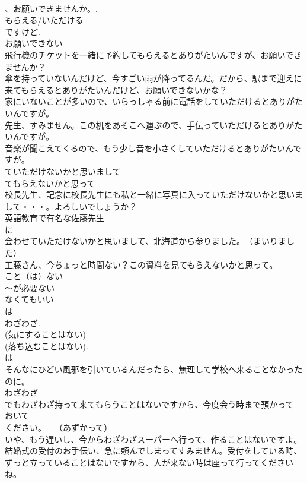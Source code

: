 \documentclass[8pt]{extreport}
\begin{document}
\begin{CJK}{UTF8}{min}
\\	、お願いできませんか。. 
\\	もらえる/いただける 
\\	ですけど. 
\\	お願いできない 
\\	飛行機のチケットを一緒に予約してもらえるとありがたいんですが、お願いできませんか？
\\	傘を持っていないんだけど、今すごい雨が降ってるんだ。だから、駅まで迎えに来てもらえるとありがたいんだけど、お願いできないかな？
\\	家にいないことが多いので、いらっしゃる前に電話をしていただけるとありがたいんですが。
\\	先生、すみません。この机をあそこへ運ぶので、手伝っていただけるとありがたいんですが。
\\	音楽が聞こえてくるので、もう少し音を小さくしていただけるとありがたいんですが。
\\	ていただけないかと思いまして
\\	てもらえないかと思って
\\	校長先生、記念に校長先生にも私と一緒に写真に入っていただけないかと思いまして・・・。よろしいでしょうか？
\\	英語教育で有名な佐藤先生
\\	に
\\	会わせていただけないかと思いまして、北海道から参りました。　（まいりました）
\\	工藤さん、今ちょっと時間ない？この資料を見てもらえないかと思って。
\\	こと（は）ない
\\	～が必要ない 
\\	なくてもいい 
\\	は 
\\	わざわざ.
\\	(気にすることはない) 
\\	(落ち込むことはない).
\\	は 
\\	そんなにひどい風邪を引いているんだったら、無理して学校へ来ることなかったのに。
\\	わざわざ 
\\	でもわざわざ持って来てもらうことはないですから、今度会う時まで預かって
\\	おいて
\\	ください。　　（あずかって）
\\	いや、もう遅いし、今からわざわざスーパーへ行って、作ることはないですよ。
\\	結婚式の受付のお手伝い、急に頼んでしまってすみません。受付をしている時、ずっと立っていることはないですから、人が来ない時は座って行ってくださいね。

\end{CJK}
\end{document}
